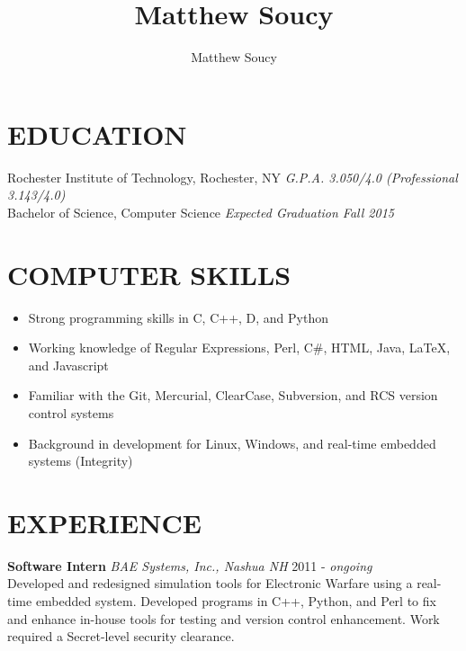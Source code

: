 \documentclass[line]{res}
\author{Matthew Soucy}
\title{Matthew Soucy}
\newcommand{\email}[1]{\href{mailto:#1}{\protect\nolinkurl{#1}}}
\def\ongoing{\textit{ongoing}}
\begin{document}
\setlength{\textheight}{11.5in} %

\address{\large
	1 Reeds Ferry Way\\
	Merrimack, NH 03054 \\
	(585) 204-7402
}
\address{\hfill
	\email{msoucy@csh.rit.edu} \\
	\url{http://msoucy.me/} \\
	\url{http://linkedin.com/in/msoucy}
}

\newenvironment{job}[3]{ \begingroup {\bf #1} {\it #2} \hfill #3\\ }{ \endgroup }

\begin{resume}

\section{EDUCATION}

	Rochester Institute of Technology, Rochester, NY
	\hfill
	\textit{G.P.A. 3.050/4.0 (Professional 3.143/4.0)} \\
	Bachelor of Science, Computer Science
	\hfill
	\textit{Expected Graduation Fall 2015}

\section{COMPUTER SKILLS}

	\begin{itemize}[leftmargin=10pt]
	\item Strong programming skills in C, C++, D, and Python
	\item Working knowledge of Regular Expressions, Perl, C\#, HTML, Java, \LaTeX, and Javascript
	\item Familiar with the Git, Mercurial, ClearCase, Subversion, and RCS version control systems
	\item Background in development for Linux, Windows, and real-time embedded systems (Integrity)
	\end{itemize}

\section{EXPERIENCE}

	\begin{job}{Software Intern}{BAE Systems, Inc., Nashua NH}{2011 - \ongoing}
		Developed and redesigned simulation tools for Electronic Warfare using a real-time embedded system.
		Developed programs in C++, Python, and Perl to fix and enhance in-house tools for testing and version control enhancement.
		Work required a Secret-level security clearance.
	\end{job}


\end{resume}
\end{document}
